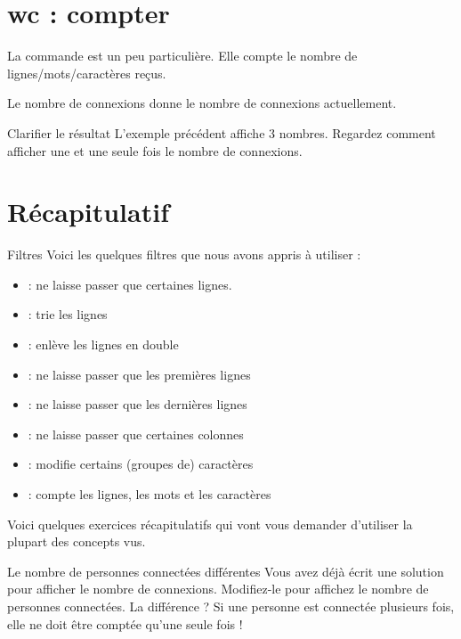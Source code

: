 \documentclass[a4paper,11pt]{style-esi/td}
\begin{document}
	\section{wc : compter}

		La commande  est un peu particulière.
		Elle compte le nombre de lignes/mots/ca\-rac\-tè\-res reçus.

		\begin{Exemple}{Le nombre de connexions}
			 donne le nombre de connexions actuellement.
		\end{Exemple}

		\begin{Exercice}{Clarifier le résultat}
			L'exemple précédent affiche 3 nombres.
			Regardez comment afficher une et une seule fois le nombre
			de connexions.
		\end{Exercice}

	\section{Récapitulatif}

		\begin{theorie}{Filtres}
			Voici les quelques filtres que nous avons appris à utiliser :
			\begin{itemize}
				\item {} : ne laisse passer que certaines lignes.
				\item {} : trie les lignes
				\item {} : enlève les lignes en double
				\item {} : ne laisse passer que les premières lignes
				\item {} : ne laisse passer que les dernières lignes
				\item {}  : ne laisse passer que certaines colonnes
				\item {} : modifie certains (groupes de) caractères
				\item {} : compte les lignes, les mots et les caractères
			\end{itemize}
		\end{theorie}
		
		Voici quelques exercices récapitulatifs qui vont vous demander 
		d'utiliser la plupart des concepts vus.

		\begin{Exemple}{Le nombre de personnes connectées différentes}
			Vous avez déjà écrit une solution pour afficher le nombre de connexions.
			Modifiez-le pour affichez le nombre de personnes connectées.
			La différence ? Si une personne est connectée plusieurs fois,
			elle ne doit être comptée qu'une seule fois !
		\end{Exemple}
	
\end{document}
